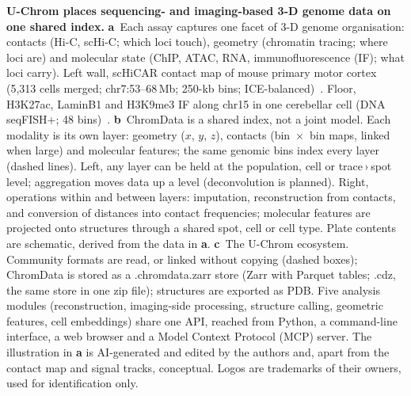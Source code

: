 \textbf{U-Chrom places sequencing- and imaging-based 3-D genome data on one shared index.}
\textbf{a}~Each assay captures one facet of 3-D genome organisation: contacts (Hi-C, scHi-C; which loci touch), geometry (chromatin tracing; where loci are) and molecular state (ChIP, ATAC, RNA, immunofluorescence (IF); what loci carry).
Left wall, scHiCAR contact map of mouse primary motor cortex (5,313 cells merged; chr7:53--68\,Mb; 250-kb bins; ICE-balanced)~\citep{schicar}.
Floor, H3K27ac, LaminB1 and H3K9me3 IF along chr15 in one cerebellar cell (DNA seqFISH+; 48 bins)~\citep{takei2025}.
\textbf{b}~ChromData is a shared index, not a joint model.
Each modality is its own layer: geometry ($x$, $y$, $z$), contacts (bin~$\times$~bin maps, linked when large) and molecular features; the same genomic bins index every layer (dashed lines).
Left, any layer can be held at the population, cell or trace\,›\,spot level; aggregation moves data up a level (deconvolution is planned).
Right, operations within and between layers: imputation, reconstruction from contacts, and conversion of distances into contact frequencies; molecular features are projected onto structures through a shared spot, cell or cell type.
Plate contents are schematic, derived from the data in \textbf{a}.
\textbf{c}~The U-Chrom ecosystem.
Community formats are read, or linked without copying (dashed boxes); ChromData is stored as a .chromdata.zarr store (Zarr with Parquet tables; .cdz, the same store in one zip file); structures are exported as PDB.
Five analysis modules (reconstruction, imaging-side processing, structure calling, geometric features, cell embeddings) share one API, reached from Python, a command-line interface, a web browser and a Model Context Protocol (MCP) server.
The illustration in \textbf{a} is AI-generated and edited by the authors and, apart from the contact map and signal tracks, conceptual.
Logos are trademarks of their owners, used for identification only.
